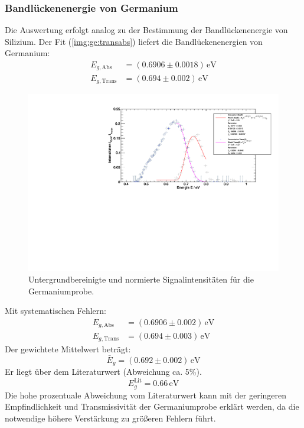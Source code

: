 \subsubsection{Bandlückenenergie von Germanium}
Die Auswertung erfolgt analog zu der Bestimmung der Bandlückenenergie von Silizium. Der Fit (\autoref{img:ge:transabs})
liefert die Bandlückenenergien von Germanium:
\begin{equation}
\begin{split}
  E_{g, \text{Abs}} &= (0.6906 \pm 0.0018)\,\text{eV} \\
  E_{g, \text{Trans}} &= (0.694 \pm 0.002)\,\text{eV}
\end{split}
\end{equation}
\begin{figure}[H]
\begin{center}
  \includegraphics[width=\textwidth]{../img/part1/Ge_fit_AbsTrans.pdf}
  \caption{Untergrundbereinigte und normierte Signalintensitäten für die Germaniumprobe.}
  \label{img:ge:transabs}
\end{center}
\end{figure}
Mit systematischen Fehlern:
\begin{equation}
\begin{split}
  E_{g, \text{Abs}} &= (0.6906 \pm 0.002)\,\text{eV} \\
  E_{g, \text{Trans}} &= (0.694 \pm 0.003)\,\text{eV}
\end{split}
\end{equation}
Der gewichtete Mittelwert beträgt:
\begin{equation}
  \bar{E}_g = (0.692 \pm 0.002)\,\text{eV}
\end{equation}
Er liegt über dem Literaturwert (Abweichung ca. 5\%).
\begin{equation}
  E_g^{\text{Lit}} = 0.66\,\text{eV}
\end{equation}
Die hohe prozentuale Abweichung vom Literaturwert kann mit der geringeren Empfindlichkeit und Transmissivität
der Germaniumprobe erklärt werden, da die notwendige höhere 
Verstärkung zu größeren Fehlern führt.

